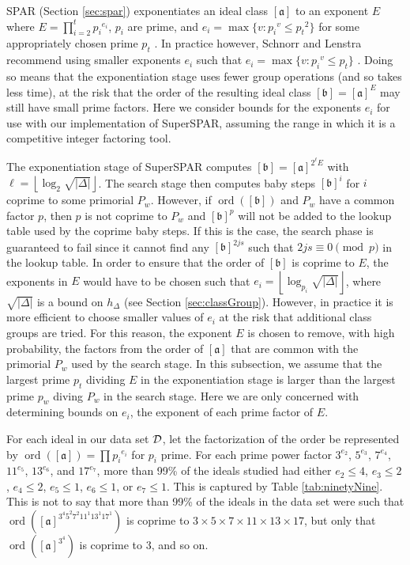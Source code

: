 \documentclass{ucalgthes1}
\theoremstyle{definition}
\DeclareMathOperator{\ord}{ord}
\newcommand{\floor}[1]{\left\lfloor #1 \right\rfloor}
\newcommand{\ideal}{\mathfrak}
\newcommand{\idealclass}[1]{\left[ \ideal #1 \right]}
\newcommand{\aclass}{\idealclass a}
\newcommand{\bclass}{\idealclass b}
\newcommand{\hdelta}{\sqrt{|\Delta|}}
\begin{document}
SPAR (Section \ref{sec:spar}) exponentiates an ideal class $\aclass$ to an exponent $E$ where $E = \prod_{i=2}^t {p_i}^{e_i}$, $p_i$ are prime, and $e_i = \max \{ v : {p_i}^v \le {p_t}^2 \}$ for some appropriately chosen prime $p_t$ \cite[p.290]{Schnorr1984}.  In practice however, Schnorr and Lenstra recommend using smaller exponents $e_i$ such that $e_i = \max \{ v : {p_i}^v \le p_t \}$ \cite[p.293]{Schnorr1984}.  Doing so means that the exponentiation stage uses fewer group operations (and so takes less time), at the risk that the order of the resulting ideal class $\bclass = \aclass ^ E$ may still have small prime factors.  Here we consider bounds for the exponents $e_i$ for use with our implementation of SuperSPAR, assuming the range in which it is a competitive integer factoring tool.

The exponentiation stage of SuperSPAR computes $\bclass = \aclass ^{2^\ell E}$ with $\ell = \floor{\log_2 \hdelta}$.  The search stage then computes baby steps $\bclass^i$ for $i$ coprime to some primorial $P_w$.  However, if $\ord(\bclass)$ and $P_w$ have a common factor $p$, then $p$ is not coprime to $P_w$ and $\bclass^p$ will not be added to the lookup table used by the coprime baby steps.  If this is the case, the search phase is guaranteed to fail since it cannot find any $\bclass^{2js}$ such that $2js \equiv 0 \pmod p$ in the lookup table.  In order to ensure that the order of $\bclass$ is coprime to $E$, the exponents in $E$ would have to be chosen such that $e_i = \floor{\log_{p_i} \hdelta}$, where $\hdelta$ is a bound on $h_\Delta$ (see Section \ref{sec:classGroup}).  However, in practice it is more efficient to choose smaller values of $e_i$ at the risk that additional class groups are tried.  For this reason, the exponent $E$ is chosen to remove, with high probability, the factors from the order of $\aclass$ that are common with the primorial $P_w$ used by the search stage.  In this subsection, we assume that the largest prime $p_t$ dividing $E$ in the exponentiation stage is larger than the largest prime $p_w$ diving $P_w$ in the search stage.  Here we are only concerned with determining bounds on $e_i$, the exponent of each prime factor of $E$.

For each ideal in our data set $\mathcal D$, let the factorization of the order be represented by $\ord(\aclass) = \prod {p_i}^{e_i}$ for $p_i$ prime.  For each prime power factor $3^{e_2}$, $5^{e_3}$, $7^{e_4}$, $11^{e_5}$, $13^{e_6}$, and $17^{e_7}$, more than 99\% of the ideals studied had either $e_2 \le 4$, $e_3 \le 2$, $e_4 \le 2$, $e_5 \le 1$, $e_6 \le 1$, or $e_7 \le 1$.  This is captured by Table \ref{tab:ninetyNine}.  This is not to say that more than 99\% of the ideals in the data set were such that $\ord(\aclass^{3^4 5^2 7^2 11^1 13^1 17^1})$ is coprime to $3 \times 5 \times 7 \times 11 \times 13 \times 17$, but only that $\ord(\aclass^{3^4})$ is coprime to 3, and so on. 
\end{document}
